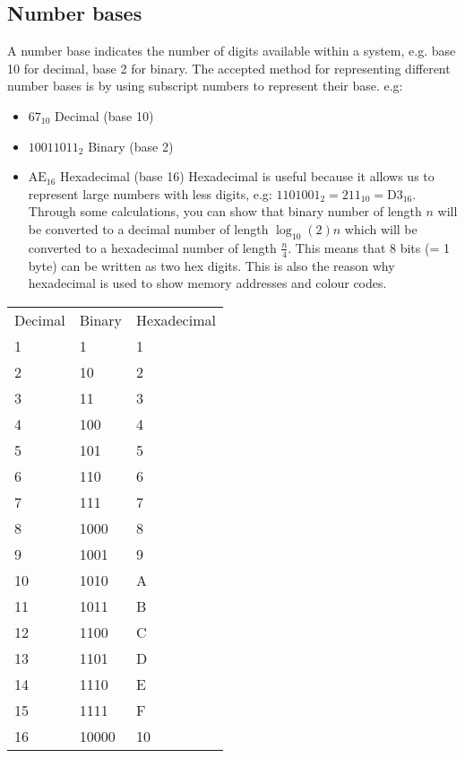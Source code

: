 \subsection{Number bases}
  \noindent
  A number base indicates the number of digits available within a system, e.g. base 10 for decimal, base 2 for binary. The accepted method for representing different number bases is by using subscript numbers to represent their base. e.g:
  \begin{itemize}
    \setlength{\itemsep}{0em}
    \item $ 67_{10} $ Decimal (base 10)
    \item $ 10011011_2 $ Binary (base 2)
    \item $ \textrm{AE}_{16} $ Hexadecimal (base 16)
    \subitem Hexadecimal is useful because it allows us to represent large numbers with less digits, e.g: $ 1101001_2 = 211_{10} = \textrm{D}3_{16} $. Through some calculations, you can show that binary number of length $ n $ will be converted to a decimal number of length $ \log_{10}{(2)}n $ which will be converted to a hexadecimal number of length $ \frac{n}{4} $. This means that 8 bits (= 1 byte) can be written as two hex digits. This is also the reason why hexadecimal is used to show memory addresses and colour codes.
  \end{itemize}
  \begin{table}[H]
    \centering
    \begin{tabular}{ C{3cm} C{3cm} C{3cm} }
      Decimal & Binary & Hexadecimal\\
      1 & 1 & 1 \\
      2 & 10 & 2 \\
      3 & 11 & 3 \\
      4 & 100 & 4 \\
      5 & 101 & 5 \\
      6 & 110 & 6 \\
      7 & 111 & 7 \\
      8 & 1000 & 8 \\
      9 & 1001 & 9 \\
      10 & 1010 & A \\
      11 & 1011 & B \\
      12 & 1100 & C \\
      13 & 1101 & D \\
      14 & 1110 & E \\
      15 & 1111 & F \\
      16 & 10000 & 10 \\
    \end{tabular}
  \end{table}
